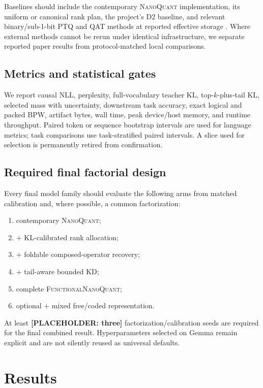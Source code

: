 \documentclass[10pt]{article}
\newcommand{\method}{\textsc{FunctionalNanoQuant}\xspace}
\newcommand{\nq}{\textsc{NanoQuant}\xspace}
\newcommand{\placeholder}[1]{\textcolor{red!70!black}{\textbf{[PLACEHOLDER: #1]}}}
\begin{document}
Baselines should include the contemporary \nq implementation, its uniform or
canonical rank plan, the project's D2 baseline, and relevant binary/sub-1-bit
PTQ and QAT methods at reported effective storage
\cite{nanoquant2026,littlebit2025,dbf2026,billm2024,hbllm2026}. Where external
methods cannot be rerun under identical infrastructure, we separate reported
paper results from protocol-matched local comparisons.

\subsection{Metrics and statistical gates}

We report causal NLL, perplexity, full-vocabulary teacher KL, top-$k$-plus-tail
KL, selected mass with uncertainty, downstream task accuracy, exact logical
and packed BPW, artifact bytes, wall time, peak device/host memory, and runtime
throughput. Paired token or sequence bootstrap intervals are used for
language metrics; task comparisons use task-stratified paired intervals. A
slice used for selection is permanently retired from confirmation.

\subsection{Required final factorial design}

Every final model family should evaluate the following arms from matched
calibration and, where possible, a common factorization:
\begin{enumerate}
  \item contemporary \nq;
  \item $+$ KL-calibrated rank allocation;
  \item $+$ foldable composed-operator recovery;
  \item $+$ tail-aware bounded KD;
  \item complete \method;
  \item optional $+$ mixed free/coded representation.
\end{enumerate}
At least \placeholder{three} factorization/calibration seeds are required for
the final combined result. Hyperparameters selected on Gemma remain explicit
and are not silently reused as universal defaults.

\section{Results}
\end{document}
